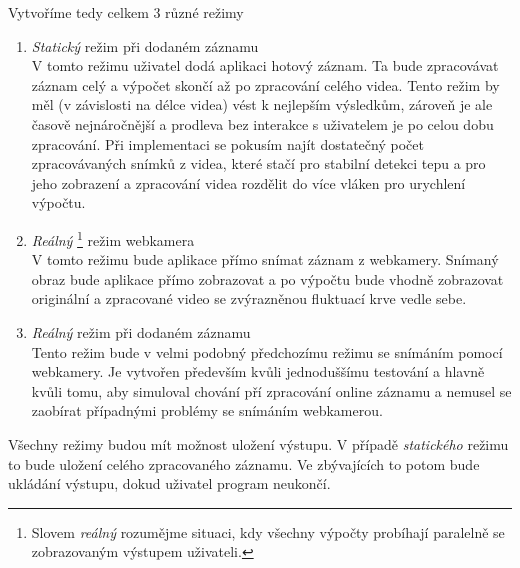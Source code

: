 \documentclass[
  digital, %
  table,   %
%
  lof,     %
  lot,     %
]{fithesis3}
\begin{document}
Vytvoříme tedy celkem 3 různé režimy
\begin{enumerate}
	\item \emph{Statický} režim při dodaném záznamu \\
    V tomto režimu uživatel dodá aplikaci hotový záznam. Ta bude zpracovávat záznam celý a výpočet skončí až po zpracování celého videa. Tento režim by měl (v závislosti na délce videa) vést k nejlepším výsledkům, zároveň je ale časově nejnáročnější a prodleva bez interakce s uživatelem je po celou dobu zpracování. Při implementaci se pokusím najít dostatečný počet zpracovávaných snímků z videa, které stačí pro stabilní detekci tepu a pro jeho zobrazení a zpracování videa rozdělit do více vláken pro urychlení výpočtu.
    \item \emph{Reálný} \footnote{Slovem \emph{reálný} rozumějme situaci, kdy všechny výpočty probíhají paralelně se zobrazovaným výstupem uživateli. } režim webkamera \\
    V tomto režimu bude aplikace přímo snímat záznam z webkamery. Snímaný obraz bude aplikace přímo zobrazovat a po výpočtu bude vhodně zobrazovat originální a zpracované video se zvýrazněnou fluktuací krve vedle sebe.
	\item \emph{Reálný} režim při dodaném záznamu \\
    Tento režim bude v velmi podobný předchozímu režimu se snímáním pomocí webkamery. Je vytvořen především kvůli jednoduššímu testování a hlavně kvůli tomu, aby simuloval chování pří zpracování online záznamu a nemusel se zaobírat případnými problémy se snímáním webkamerou.
\end{enumerate}

Všechny režimy budou mít možnost uložení výstupu. V případě \emph{statického} režimu to bude uložení celého zpracovaného záznamu. Ve zbývajících to potom bude ukládání výstupu, dokud uživatel program neukončí.
\end{document}
